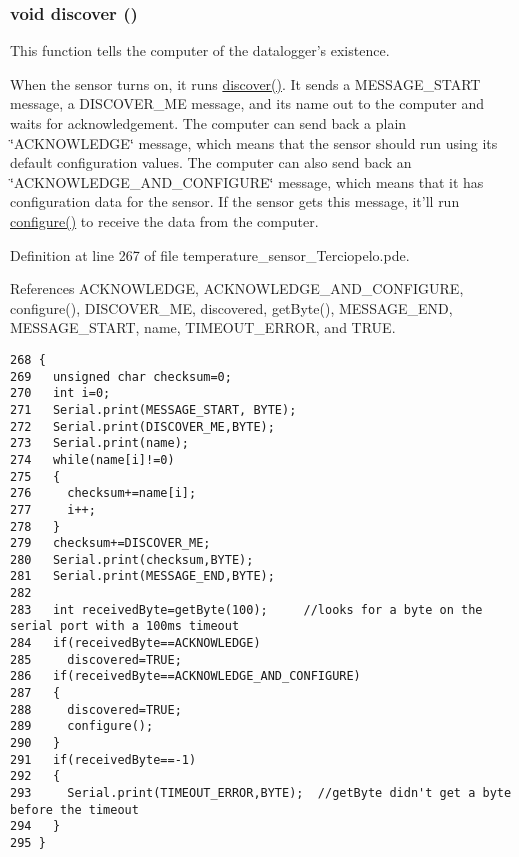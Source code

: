 \hypertarget{applet_2temperature__sensor___terciopelo_8pde_3fdb2350c3f98c0de0f0ae3c831a8b14}{
\subsubsection[{discover}]{\setlength{\rightskip}{0pt plus 5cm}void discover ()}}
\label{applet_2temperature__sensor___terciopelo_8pde_3fdb2350c3f98c0de0f0ae3c831a8b14}


This function tells the computer of the datalogger's existence. 

When the sensor turns on, it runs \hyperlink{applet_2nublogger_8h_3fdb2350c3f98c0de0f0ae3c831a8b14}{discover()}. It sends a MESSAGE\_\-START message, a DISCOVER\_\-ME message, and its name out to the computer and waits for acknowledgement. The computer can send back a plain \char`\"{}ACKNOWLEDGE\char`\"{} message, which means that the sensor should run using its default configuration values. The computer can also send back an \char`\"{}ACKNOWLEDGE\_\-AND\_\-CONFIGURE\char`\"{} message, which means that it has configuration data for the sensor. If the sensor gets this message, it'll run \hyperlink{applet_2nublogger_8h_e369b3765489ee8bd0ea791c1843630f}{configure()} to receive the data from the computer. 

Definition at line 267 of file temperature\_\-sensor\_\-Terciopelo.pde.

References ACKNOWLEDGE, ACKNOWLEDGE\_\-AND\_\-CONFIGURE, configure(), DISCOVER\_\-ME, discovered, getByte(), MESSAGE\_\-END, MESSAGE\_\-START, name, TIMEOUT\_\-ERROR, and TRUE.

\begin{Code}\begin{verbatim}268 { 
269   unsigned char checksum=0;
270   int i=0;
271   Serial.print(MESSAGE_START, BYTE);
272   Serial.print(DISCOVER_ME,BYTE);
273   Serial.print(name);
274   while(name[i]!=0)
275   {
276     checksum+=name[i];
277     i++;
278   }
279   checksum+=DISCOVER_ME;
280   Serial.print(checksum,BYTE);
281   Serial.print(MESSAGE_END,BYTE);
282 
283   int receivedByte=getByte(100);     //looks for a byte on the serial port with a 100ms timeout
284   if(receivedByte==ACKNOWLEDGE)
285     discovered=TRUE;
286   if(receivedByte==ACKNOWLEDGE_AND_CONFIGURE)
287   {
288     discovered=TRUE;
289     configure();
290   }
291   if(receivedByte==-1)
292   {
293     Serial.print(TIMEOUT_ERROR,BYTE);  //getByte didn't get a byte before the timeout
294   }  
295 }
\end{verbatim}
\end{Code}


